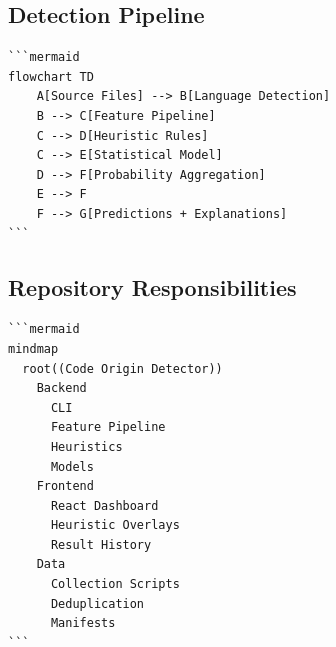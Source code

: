 \documentclass[11pt]{article}
\begin{document}
\subsection{Detection Pipeline}
\begin{verbatim}
```mermaid
flowchart TD
    A[Source Files] --> B[Language Detection]
    B --> C[Feature Pipeline]
    C --> D[Heuristic Rules]
    C --> E[Statistical Model]
    D --> F[Probability Aggregation]
    E --> F
    F --> G[Predictions + Explanations]
```
\end{verbatim}

\subsection{Repository Responsibilities}
\begin{verbatim}
```mermaid
mindmap
  root((Code Origin Detector))
    Backend
      CLI
      Feature Pipeline
      Heuristics
      Models
    Frontend
      React Dashboard
      Heuristic Overlays
      Result History
    Data
      Collection Scripts
      Deduplication
      Manifests
```
\end{verbatim}
\end{document}
